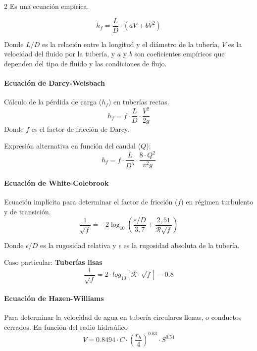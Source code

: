 \documentclass[11pt]{article}
\begin{document}
\begin{multicols*}{2}
    Es una ecuación empírica.

    \begin{equation}
        h_f=\frac{L}{D}\cdot \left(aV + bV^2\right)
    \end{equation}
    
    Donde $L/D$ es la relación entre la longitud y el diámetro de la tubería, $V$ es la velocidad del fluido por la tubería, y $a$ y $b$ son coeficientes empíricos que dependen del tipo de fluido y las condiciones de flujo.
    \paragraph*{Ecuación de Darcy-Weisbach}
    Cálculo de la pérdida de carga ($h_f$) en tuberías rectas.
    \begin{equation}
        h_f = f \cdot \frac{L}{D} \cdot \frac{V^2}{2g}
    \end{equation}
    Donde $f$ es el factor de fricción de Darcy.
    
    Expresión alternativa en función del caudal ($Q$):
    \begin{equation}
        h_f = f \cdot \frac{L}{D^5} \cdot \frac{8 \cdot Q^2}{\pi^2 g}
    \end{equation}
    
    \paragraph*{Ecuación de White-Colebrook}
    Ecuación implícita para determinar el factor de fricción ($f$) en régimen turbulento y de transición.
    \begin{equation}
        \frac{1}{\sqrt{f}} = -2 \log_{10} \left( \frac{\varepsilon/D}{3,7} + \frac{2,51}{\mathcal{R}\sqrt{f}} \right)
    \end{equation}

    Donde $\epsilon/D$ es la rugosidad relativa y $\epsilon$ es la rugosidad absoluta de la tubería.

    Caso particular: \textbf{Tuberías lisas}
    \begin{equation}
        \frac{1}{\sqrt{f}}= 2 \cdot log_{10} \left[ \mathcal{R} \cdot \sqrt{f} \right] - 0.8
    \end{equation}

    \paragraph*{Ecuación de Hazen-Williams}
        Para determinar la velocidad de agua en tubería circulares llenas, o conductos cerrados.
        En función del radio hidraúlico
        \begin{equation}
            V = 0.8494 \cdot C \cdot \left(\frac{r_h}{4}\right)^{0.63} \cdot S^{0.54}
        \end{equation}


\end{multicols*}
\end{document}
